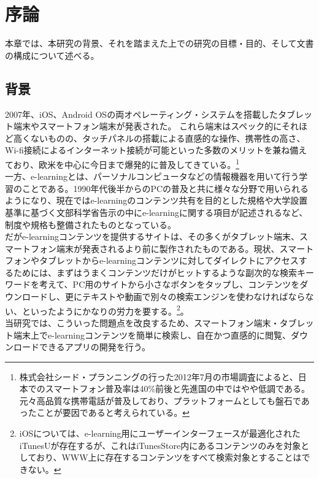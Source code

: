 \chapter{序論}
\label{chap:introduction}

本章では、本研究の背景、それを踏まえた上での研究の目標・目的、そして文書の構成について述べる。

\section{背景}

2007年、iOS、Android OSの両オペレーティング・システムを搭載したタブレット端末やスマートフォン端末が発表された。
これら端末はスペック的にそれほど高くないものの、タッチパネルの搭載による直感的な操作、携帯性の高さ、Wi-fi接続によるインターネット接続が可能といった多数のメリットを兼ね備えており、欧米を中心に今日まで爆発的に普及してきている。\footnote{株式会社シード・プランニングの行った2012年7月の市場調査\cite{smartphoneresearch}によると、日本でのスマートフォン普及率は40\%前後と先進国の中ではやや低調である。元々高品質な携帯電話が普及しており、プラットフォームとしても盤石であったことが要因であると考えられている。}\\
一方、e-learningとは、パーソナルコンピュータなどの情報機器を用いて行う学習のことである。1990年代後半からのPCの普及と共に様々な分野で用いられるようになり、現在ではe-learningのコンテンツ共有を目的とした規格\cite{scorm}や大学設置基準に基づく文部科学省告示の中にe-learningに関する項目が記述される\cite{monkasho}など、制度や規格も整備されたものとなっている。\\
だがe-learningコンテンツを提供するサイトは、その多くがタブレット端末、スマートフォン端末が発表されるより前に製作されたものである。現状、スマートフォンやタブレットからe-learningコンテンツに対してダイレクトにアクセスするためには、まずはうまくコンテンツだけがヒットするような副次的な検索キーワードを考えて、PC用のサイトから小さなボタンをタップし、コンテンツをダウンロードし、更にテキストや動画で別々の検索エンジンを使わなければならない、といったようにかなりの労力を要する。\footnote{iOSについては、e-learning用にユーザーインターフェースが最適化されたiTunesU\cite{itunesu}が存在するが、これはiTunesStore内にあるコンテンツのみを対象としており、WWW上に存在するコンテンツをすべて検索対象とすることはできない。}。\\
当研究では、こういった問題点を改良するため、スマートフォン端末・タブレット端末上でe-learningコンテンツを簡単に検索し、自在かつ直感的に閲覧、ダウンロードできるアプリの開発を行う。



